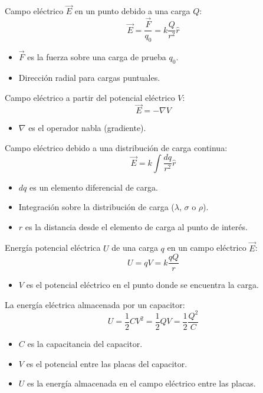 \begin{tcolorbox}[title=Campo Eléctrico]
  Campo eléctrico \(\vec{E}\) en un punto debido a una carga \(Q\):
  \[
    \vec{E} = \frac{\vec{F}}{q_0} = k \frac{Q}{r^2} \hat{r}
  \]
  \begin{itemize}
    \item \(\vec{F}\) es la fuerza sobre una carga de prueba \(q_0\).
    \item Dirección radial para cargas puntuales.
  \end{itemize}

  Campo eléctrico a partir del potencial eléctrico \(V\):
  \[
    \vec{E} = -\nabla V
  \]
  \begin{itemize}
    \item \(\nabla\) es el operador nabla (gradiente).
  \end{itemize}
  Campo eléctrico debido a una distribución de carga continua:
  \[
    \vec{E} = k \int \frac{dq}{r^2} \hat{r}
  \]
  \begin{itemize}
    \item \(dq\) es un elemento diferencial de carga.
    \item Integración sobre la distribución de carga (\(\lambda\), \(\sigma\) o \(\rho\)).
    \item \(r\) es la distancia desde el elemento de carga al punto de interés.
  \end{itemize}
\end{tcolorbox}

\begin{tcolorbox}[title=Energía Potencial]
  Energía potencial eléctrica \(U\) de una carga \(q\) en un campo eléctrico \(\vec{E}\):
  \[
    U = qV = k\frac{qQ}{r}
  \]
  \begin{itemize}
    \item \(V\) es el potencial eléctrico en el punto donde se encuentra la carga.
  \end{itemize}
  La energía eléctrica almacenada por un capacitor:
  \[
    U = \frac{1}{2} CV^2 = \frac{1}{2} QV = \frac{1}{2} \frac{Q^2}{C}
  \]
  \begin{itemize}
    \item \(C\) es la capacitancia del capacitor.
    \item \(V\) es el potencial entre las placas del capacitor.
    \item \(U\) es la energía almacenada en el campo eléctrico entre las placas.
  \end{itemize}
\end{tcolorbox}
  
